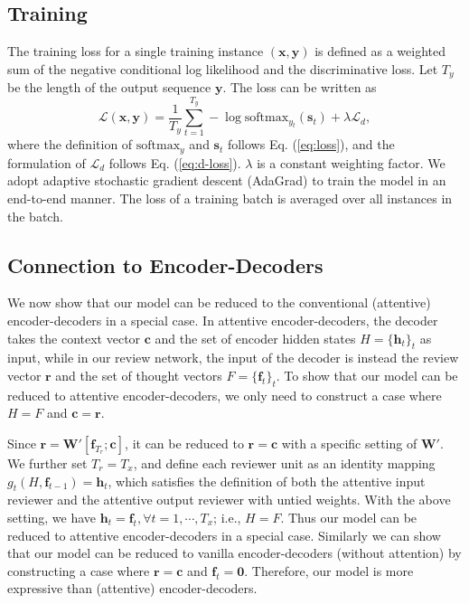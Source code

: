 \documentclass{article}
\begin{document}
\subsection{Training}

The training loss for a single training instance $(\mathbf{x}, \mathbf{y})$ is defined as a weighted sum of the negative conditional log likelihood and the discriminative loss. Let $T_y$ be the length of the output sequence $\mathbf{y}$. The loss can be written as
\[
\mathcal{L}(\mathbf{x}, \mathbf{y}) = \frac{1}{T_y} \sum_{t = 1}^{T_y} - \log \mbox{softmax}_{y_t}(\mathbf{s}_t) + \lambda \mathcal{L}_d,
\]
where the definition of $\mbox{softmax}_y$ and $\mathbf{s}_t$ follows Eq. (\ref{eq:loss}), and the formulation of $\mathcal{L}_d$ follows Eq. (\ref{eq:d-loss}). $\lambda$ is a constant weighting factor. We adopt adaptive stochastic gradient descent (AdaGrad) \cite{duchi2011adaptive} to train the model in an end-to-end manner. The loss of a training batch is averaged over all instances in the batch.

\subsection{Connection to Encoder-Decoders}

We now show that our model can be reduced to the conventional (attentive) encoder-decoders in a special case. In attentive encoder-decoders, the decoder takes the context vector $\mathbf{c}$ and the set of encoder hidden states $H = \{\mathbf{h}_t\}_t$ as input, while in our review network, the input of the decoder is instead the review vector $\mathbf{r}$ and the set of thought vectors $F = \{\mathbf{f}_t\}_t$. To show that our model can be reduced to attentive encoder-decoders, we only need to construct a case where $H = F$ and $\mathbf{c} = \mathbf{r}$.

Since $\mathbf{r} = \mathbf{W}'[\mathbf{f}_{T_r}; \mathbf{c}]$, it can be reduced to $\mathbf{r} = \mathbf{c}$ with a specific setting of $\mathbf{W}'$. We further set $T_r = T_x$, and define each reviewer unit as an identity mapping $g_t(H, \mathbf{f}_{t - 1}) = \mathbf{h}_t$, which satisfies the definition of both the attentive input reviewer and the attentive output reviewer with untied weights. With the above setting, we have $\mathbf{h}_t = \mathbf{f}_t, \forall t = 1, \cdots, T_x$; i.e., $H = F$. Thus our model can be reduced to attentive encoder-decoders in a special case. Similarly we can show that our model can be reduced to vanilla encoder-decoders (without attention) by constructing a case where $\mathbf{r} = \mathbf{c}$ and $\mathbf{f}_t = \mathbf{0}$. Therefore, our model is more expressive than (attentive) encoder-decoders.
\end{document}
